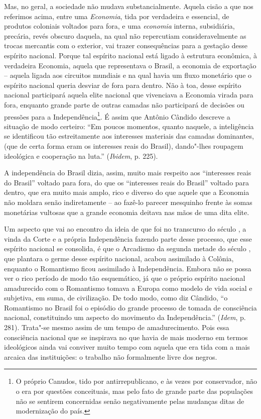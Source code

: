 Mas, no geral, a sociedade não mudava substancialmente. Aquela cisão a
que nos referimos acima, entre uma \emph{Economia}, tida por verdadeira
e essencial, de produtos coloniais voltados para fora, e uma
\emph{economia} interna, subsidiária, precária, revés obscuro daquela,
na qual não repercutiam consideravelmente as trocas mercantis com o
exterior, vai trazer consequências para a gestação desse espírito
nacional. Porque tal espírito nacional está ligado à estrutura
econômica, à verdadeira Economia, aquela que representava o Brasil, a
economia de exportação -- aquela ligada aos circuitos mundiais e na qual
havia um fluxo monetário que o espírito nacional queria desviar de fora
para dentro. Não à toa, desse espírito nacional participará aquela elite
nacional que vivenciava a Economia virada para fora, enquanto grande
parte de outras camadas não participará de decisões ou pressões para a
Independência\footnote{O próprio Canudos, tido por antirrepublicano, e
  às vezes por conservador, não o era por questões conceituais, mas pelo
  fato de grande parte das populações não se sentirem concernidas senão
  negativamente pelas mudanças ditas de modernização do país.}. É assim
que Antônio Cândido descreve a situação de modo certeiro: ``Em poucos
momentos, quanto naquele, a inteligência se identificou tão
estreitamente aos interesses materiais das camadas dominantes, (que de
certa forma eram os interesses reais do Brasil), dando"-lhes roupagem
ideológica e cooperação na luta.'' (\emph{Ibidem}, p. 225).

A independência do Brasil dizia, assim, muito mais respeito aos
``interesses reais do Brasil'' voltado para fora, do que os ``interesses
reais do Brasil'' voltado para dentro, que era muito mais amplo, rico e
diverso do que aquele que a Economia não moldara senão indiretamente --
ao fazê-lo parecer mesquinho frente às somas monetárias vultosas que a
grande economia deitava nas mãos de uma dita elite.

Um aspecto que vai ao encontro da ideia de que foi no transcurso do
século , a vinda da Corte e a própria Independência fazendo parte
desse processo, que esse espírito nacional se consolida, é que o
Arcadismo da segunda metade do século , que plantara o germe desse
espírito nacional, acabou assimilado à Colônia, enquanto o Romantismo
ficou assimilado à Independência. Embora não se possa ver o rico período
de modo tão esquemático, já que o próprio espírito nacional amadurecido
com o Romantismo tomava a Europa como modelo de vida social e subjetiva,
em suma, de civilização. De todo modo, como diz Cândido, ``o Romantismo
no Brasil foi o episódio do grande processo de tomada de consciência
nacional, constituindo um aspecto do movimento da Independência.''
(\emph{Idem}, p. 281). Trata"-se mesmo assim de um tempo de
amadurecimento. Pois essa consciência nacional que se inspirava no que
havia de mais moderno em termos ideológicos ainda vai conviver muito
tempo com aquela que era tida com a mais arcaica das instituições: o
trabalho não formalmente livre dos negros.

